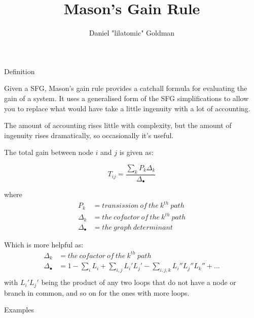 \documentclass{../templates/topic}
\title{Mason's Gain Rule}
\author{Daniel "lilatomic" Goldman}
\begin{document}
\maketitle

\begin{section}{Definition}
	
	Given a SFG, Mason's gain rule provides a catchall formula for evaluating the gain of a system. It uses a generalised form of the SFG simplifications to allow you to replace what would have take a little ingenuity with a lot of accounting.
	
	The amount of accounting rises little with complexity, but the amount of ingenuity rises dramatically, so occasionally it's useful.
	
	The total gain between node $i$ and $j$ is given as:
	
	\begin{equation}
		T_{ij} = \frac{\sum_{k}P_{k}\Delta_{k}}{\Delta_{\bullet}}
	\end{equation}
	
	where
	\begin{align*}
		P_{k}&= transission\ of\ the\ k^{th}\ path \\
		\Delta_{k}&= the\ cofactor\ of\ the\ k^{th}\ path \\
		\Delta_{\bullet}&= the\ graph\ determinant\
	\end{align*}
	
	Which is more helpful as:
	\begin{align*}
		\Delta_{k}&= the\ cofactor\ of\ the\ k^{th}\ path \\
		\Delta_{\bullet}&= 1 - \sum_{i}L_i + \sum_{i,j}L_i' L_j'  - \sum_{i,j,k}L_i'' L_j''L_k'' + ... \\
	\end{align*}
	with $L_i'L_j'$ being the product of any two loops that do not have a node or branch in common, and so on for the ones with more loops.
	
\end{section}

\begin{section}{Examples}
	
	
	
\end{section}
\end{document}
